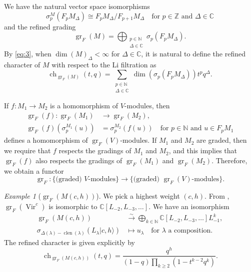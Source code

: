 \documentclass[a4paper, 12pt, reqno]{amsart}
\theoremstyle{remark}
\newtheorem{example}[theorem]{Example}
\DeclareMathOperator{\Vir}{Vir}
\DeclareMathOperator{\ch}{ch}
\DeclareMathOperator{\clen}{clen}
\DeclareMathOperator{\gr}{gr}
\begin{document}
We have the natural vector space isomorphisms
\begin{equation*}
  \sigma^M_p(F_pM_{\Delta}) \cong F_pM_{\Delta}/F_{p + 1}M_{\Delta} \quad \text{for $p \in \mathbb{Z}$ and $\Delta \in \mathbb{C}$}
\end{equation*}
and the refined grading
\begin{equation}
  \label{eq:3}
  \gr_F(M) = \bigoplus_{\substack{p \in \mathbb{N} \\ \Delta \in \mathbb{C}}}\sigma_p(F_pM_{\Delta}).
\end{equation}
By \eqref{eq:3}, when $\dim(M)_{\Delta} < \infty$ for $\Delta \in \mathbb{C}$, it is natural to define the refined character of $M$ with respect to the Li filtration as
\begin{equation*}
  \ch_{\gr_F(M)}(t, q) = \sum_{\substack{p \in \mathbb{N} \\ \Delta \in \mathbb{C}}}\dim(\sigma_p(F_pM_{\Delta}))t^pq^{\Delta}.
\end{equation*}

If $f: M_1 \to M_2$ is a homomorphism of $V$-modules, then
\begin{align*}
  \gr_F(f): \gr_F(M_1) &\to \gr_F(M_2), \\
  \gr_F(f)(\sigma^{M_1}_p(u)) &= \sigma^{M_2}_p(f(u)) \quad \text{for $p \in \mathbb{N}$ and $u \in F_pM_1$}
\end{align*}
defines a homomorphism of $\gr_F(V)$-modules.
If $M_1$ and $M_2$ are graded, then we require that $f$ respects the gradings of $M_1$ and $M_2$, and this implies that $\gr_F(f)$ also respects the gradings of $\gr_F(M_1)$ and $\gr_F(M_2)$.
Therefore, we obtain a functor
\begin{equation*}
  \gr_F: \{\text{(graded) $V$-modules}\} \to \{\text{(graded) $\gr_F(V)$-modules}\}.
\end{equation*}

\begin{example}[$\gr_F(M(c, h))$]
  \label{exa:8}
  We pick a highest weight $(c, h)$.
  From , $\gr_F(\Vir^c)$ is isomorphic to $\mathbb{C}[L_{-2}, L_{-3}, \dots]$.
  We have an isomorphism
  \begin{align*}
    \gr_F(M(c, h)) &\xrightarrow{\sim} \bigoplus_{k \in \mathbb{N}}\mathbb{C}[L_{-2}, L_{-3}, \dots]L_{-1}^k, \\
    \sigma_{\Delta(\lambda) - \clen(\lambda)}(L_{\lambda}|c, h\rangle) &\mapsto u_{\lambda} \quad \text{for $\lambda$ a composition}.
  \end{align*}
  The refined character is given explicitly by
  \begin{equation*}
    \ch_{\gr_F(M(c, h))}(t, q) = \frac{q^h}{(1 - q)\prod_{k \ge 2}(1 - t^{k - 2}q^k)}.
  \end{equation*}
\end{example}
\end{document}

